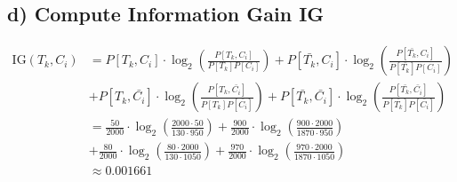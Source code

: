 \documentclass[a4paper]{article}
\begin{document}
\subsection*{d) Compute Information Gain IG}
\begin{align*} 
\text{IG}(T_k,C_i) &= P[T_k,C_i] \cdot \log_2 \left( \frac{P[T_k,C_i]}{P[T_k] P[C_i]}\right) + P[\bar{T_k},C_i] \cdot \log_2 \left( \frac{P[\bar{T_k},C_i]}{P[\bar{T_k}] P[C_i]}\right) \\
&+ P[T_k,\bar{C_i}] \cdot \log_2 \left( \frac{P[T_k,\bar{C_i}]}{P[T_k] P[\bar{C_i}]}\right) + P[\bar{T_k},\bar{C_i}] \cdot \log_2 \left( \frac{P[\bar{T_k},\bar{C_i}]}{P[\bar{T_k}] P[\bar{C_i}]}\right) \\
&= \frac{50}{2000} \cdot \log_2\left(\frac{2000 \cdot 50}{130 \cdot 950} \right) + \frac{900}{2000} \cdot \log_2 \left( \frac{900 \cdot 2000}{1870 \cdot 950}\right) \\
&+ \frac{80}{2000} \cdot \log_2 \left(\frac{80 \cdot 2000}{130 \cdot 1050} \right) + \frac{970}{2000} \cdot \log_2 \left(\frac{970 \cdot 2000}{1870 \cdot 1050} \right) \\
&\approx 0.001661
\end{align*}
\end{document}
